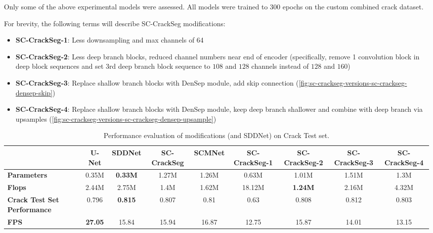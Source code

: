 \documentclass[a4paper,12pt]{report}
\begin{document}
Only some of the above experimental models were assessed. All models were trained to 300 epochs on the custom combined crack dataset.

For brevity, the following terms will describe SC-CrackSeg modifications:
\begin{itemize}
    \item \textbf{SC-CrackSeg-1}: Less downsampling and max channels of 64
    \item \textbf{SC-CrackSeg-2}: Less deep branch blocks, reduced channel numbers near end of encoder (specifically, remove 1 convolution block in deep block sequences and set 3rd deep branch block sequence to $108$ and $128$ channels instead of $128$ and $160$)
    \item \textbf{SC-CrackSeg-3}: Replace shallow branch blocks with DenSep module, add skip connection (\autoref{fig:sc-crackseg-versions-sc-crackseg-densep-skip})
    \item \textbf{SC-CrackSeg-4}: Replace shallow branch blocks with DenSep module, keep deep branch shallower and combine with deep branch via upsamples (\autoref{fig:sc-crackseg-versions-sc-crackseg-densep-upsample})
\end{itemize}

\begin{table}[htbp]
    \begin{adjustbox}{width=\columnwidth,center}
        \begin{tabular}{|p{}|c|c|c|c|c|c|c|c|}
            \hline
                                                & \textbf{U-Net} & \textbf{SDDNet} & \textbf{SC-CrackSeg} & \textbf{SCMNet} & \textbf{SC-CrackSeg-1} & \textbf{SC-CrackSeg-2} & \textbf{SC-CrackSeg-3} & \textbf{SC-CrackSeg-4} \\
            \hline
            \textbf{Parameters}                 & 0.35M          & \textbf{0.33M}  & 1.27M                & 1.26M           & 0.63M                  & 1.01M                  & 1.51M                  & 1.3M                   \\
            \hline
            \textbf{Flops}                      & 2.44M          & 2.75M           & 1.4M                 & 1.62M           & 18.12M                 & \textbf{1.24M}         & 2.16M                  & 4.32M                  \\
            \hline
            \textbf{Crack Test Set Performance} & 0.796          & \textbf{0.815}  & 0.807                & 0.81            & 0.63                   & 0.808                  & 0.812                  & 0.803                  \\
            \hline
            \textbf{FPS}                        & \textbf{27.05} & 15.84           & 15.94                & 16.87           & 12.75                  & 15.87                  & 14.01                  & 13.15                  \\
            \hline
        \end{tabular}
    \end{adjustbox}
    \caption{Performance evaluation of modifications (and SDDNet) on Crack Test set.}%
    \label{}
\end{table}
\end{document}
